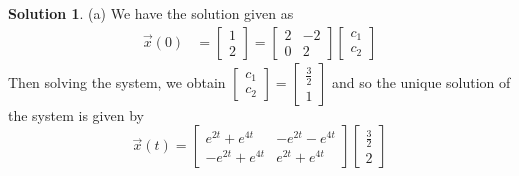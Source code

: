 \documentclass[11pt]{article}
\theoremstyle{definition}\newtheorem{definition}{Definition}
\theoremstyle{definition}\newtheorem{question}{Question}
\theoremstyle{definition}\newtheorem*{solution}{Solution}
\theoremstyle{definition}\newtheorem{example}{Example}
\theoremstyle{definition}\newtheorem{notation}{Notation}
\theoremstyle{theorem}\newtheorem{theorem}{Theorem}
\theoremstyle{theorem}\newtheorem{corollary}{Corollary}
\theoremstyle{theorem}\newtheorem{lemma}{Lemma}
\theoremstyle{theorem}\newtheorem{proposition}{Proposition}
\begin{document}
\begin{solution}
    (a) We have the solution given as
    \begin{align*}
        \vec{x}(0) &= \begin{bmatrix} 1 \\ 2 \end{bmatrix} = \begin{bmatrix} 2 & -2 \\ 0 & 2 \end{bmatrix} \begin{bmatrix} c_1 \\ c_2 \end{bmatrix}
    \end{align*}
    Then solving the system, we obtain $\begin{bmatrix} c_1 \\ c_2 \end{bmatrix} = \begin{bmatrix} \frac{3}{2} \\ 1 \end{bmatrix}$ and so the unique solution of the system is given by
    \begin{equation*}
        \vec{x}(t) = \begin{bmatrix} e^{2t} + e^{4t} & -e^{2t} - e^{4t} \\ -e^{2t} + e^{4t} & e^{2t} + e^{4t} \end{bmatrix} \begin{bmatrix} \frac{3}{2} \\ 2 \end{bmatrix}
    \end{equation*}


\end{solution}
\end{document}
